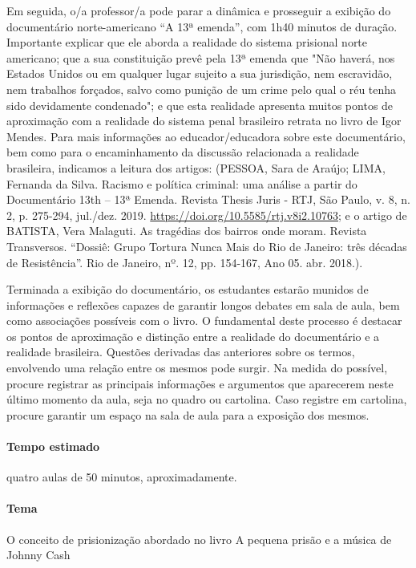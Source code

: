 \documentclass[11pt]{extarticle}
\begin{document}
Em seguida, o/a professor/a pode parar a dinâmica e prosseguir a
exibição do documentário norte-americano ``A 13ª emenda'', com 1h40
minutos de duração. Importante explicar que ele aborda a realidade do
sistema prisional norte americano; que a sua constituição prevê pela 13ª
emenda que "Não haverá, nos Estados Unidos ou em qualquer lugar sujeito
a sua jurisdição, nem escravidão, nem trabalhos forçados, salvo como
punição de um crime pelo qual o réu tenha sido devidamente condenado"; e
que esta realidade apresenta muitos pontos de aproximação com a
realidade do sistema penal brasileiro retrata no livro de Igor Mendes.
Para mais informações ao educador/educadora sobre este documentário, bem
como para o encaminhamento da discussão relacionada a realidade
brasileira, indicamos a leitura dos artigos: (PESSOA, Sara de Araújo;
LIMA, Fernanda da Silva. Racismo e política criminal: uma análise a
partir do Documentário 13th -- 13ª Emenda. Revista Thesis Juris - RTJ,
São Paulo, v. 8, n. 2, p. 275-294, jul./dez. 2019.
\href{https://doi.org/10.5585/rtj.v8i2.10763}{{https://doi.org/10.5585/rtj.v8i2.10763}};
e o artigo de BATISTA, Vera Malaguti. As tragédias dos bairros onde
moram. Revista Transversos. ``Dossiê: Grupo Tortura Nunca Mais do Rio de
Janeiro: três décadas de Resistência''. Rio de Janeiro, nº. 12, pp.
154-167, Ano 05. abr. 2018.).

Terminada a exibição do documentário, os estudantes estarão munidos de
informações e reflexões capazes de garantir longos debates em sala de
aula, bem como associações possíveis com o livro. O fundamental deste
processo é destacar os pontos de aproximação e distinção entre a
realidade do documentário e a realidade brasileira. Questões derivadas
das anteriores sobre os termos, envolvendo uma relação entre os mesmos
pode surgir. Na medida do possível, procure registrar as principais
informações e argumentos que aparecerem neste último momento da aula,
seja no quadro ou cartolina. Caso registre em cartolina, procure
garantir um espaço na sala de aula para a exposição dos mesmos.

\paragraph{Tempo estimado} quatro aulas de 50 minutos, aproximadamente.

\paragraph{Tema} O conceito de prisionização abordado no livro A pequena
prisão e a música de Johnny Cash
\end{document}

